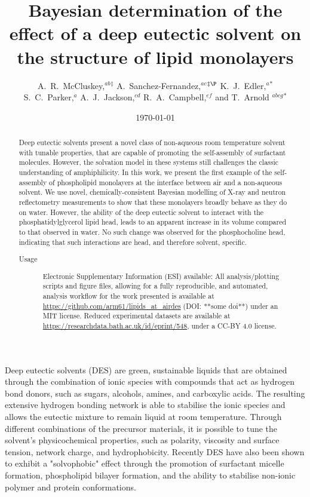 \documentclass[twocolumn,a4paper]{paper}
\title{Bayesian determination of the effect of a deep eutectic solvent on the structure of lipid monolayers}
\author{A.~R.~McCluskey,\textit{$^{ab}$}$^{\ddag}$ A.~Sanchez-Fernandez,\textit{$^{ac}$}$^{\ddag\P}$ K.~J.~Edler,\textit{$^{a}$}$^{\ast}$ \\
S.~C.~Parker,\textit{$^{a}$} A.~J.~Jackson,\textit{$^{cd}$} R.~A.~Campbell,\textit{$^{ef}$} and T.~Arnold \textit{$^{abcg}$}$^{\ast}$}
\date{\today}
\begin{document}
\maketitle

\begin{abstract}
Deep eutectic solvents present a novel class of non-aqueous room temperature solvent with tunable properties, that are capable of promoting the self-assembly of surfactant molecules.
However, the solvation model in these systems still challenges the classic understanding of amphiphilicity.
In this work, we present the first example of the self-assembly of phospholipid monolayers at the interface between air and a non-aqueous solvent.
We use novel, chemically-consistent Bayesian modelling of X-ray and neutron reflectometry measurements to show that these monolayers broadly behave as they do on water.
However, the ability of the deep eutectic solvent to interact with the phosphatidylglycerol lipid head, leads to an apparent increase in its volume compared to that observed in water.
No such change was observed for the phosphocholine head, indicating that such interactions are head, and therefore solvent, specific.
\begin{description}
\item[Usage]
Electronic Supplementary Information (ESI) available: All analysis/plotting scripts and figure files, allowing for a fully reproducible, and automated, analysis workflow for the work presented is available at \url{https://github.com/arm61/lipids_at_airdes} (DOI: **some doi**) under an MIT license. Reduced experimental datasets are available at \url{https://researchdata.bath.ac.uk/id/eprint/548}, under a CC-BY 4.0 license.
\end{description}
\end{abstract}


Deep eutectic solvents (DES) are green, sustainable liquids that are obtained through the combination of ionic species with compounds that act as hydrogen bond donors, such as sugars, alcohols, amines, and carboxylic acids\cite{Smith2014,Dai2013}.
The resulting extensive hydrogen bonding network is able to stabilise the ionic species and allows the eutectic mixture to remain liquid at room temperature\cite{Hammond2016,Hammond2017,Araujo2017}.
Through different combinations of the precursor materials, it is possible to tune the solvent's physicochemical properties, such as polarity\cite{Pandey2014}, viscosity and surface tension\cite{Smith2014}, network charge\cite{Zahn2016}, and hydrophobicity\cite{Ribeiro2015,vanOsch2015}.
Recently DES have also been shown to exhibit a "solvophobic" effect through the promotion of surfactant micelle formation\cite{Sanchez-Fernandez2016,Arnold2015}, phospholipid bilayer formation\cite{Bryant2017,Bryant2016,Gutierrez2009}, and the ability to stabilise non-ionic polymer\cite{Sapir2016} and protein conformations\cite{Sanchez-Fernandez2017}.
\end{document}
